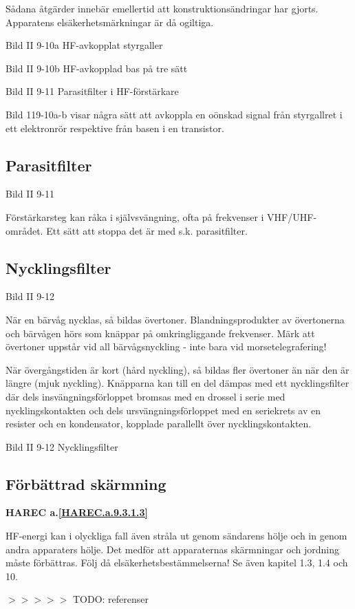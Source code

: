 Sådana åtgärder innebär emellertid att konstruktionsändringar har
gjorts. Apparatens elsäkerhetsmärkningar är då ogiltiga.

Bild II 9-10a HF-avkopplat styrgaller

Bild II 9-10b HF-avkopplad bas på tre sätt

Bild II 9-11 Parasitfilter i HF-förstärkare

Bild 119-10a-b visar några sätt att avkoppla en oönskad signal från
styrgallret i ett elektronrör respektive från basen i en transistor.

\subsection{Parasitfilter}

Bild II 9-11

Förstärkarsteg kan råka i självsvängning, ofta på frekvenser i
VHF/UHF-området. Ett sätt att stoppa det är med s.k. parasitfilter.

\subsection{Nycklingsfilter}

Bild II 9-12

När en bärvåg nycklas, så bildas övertoner.  Blandningsprodukter av
övertonerna och bärvågen hörs som knäppar på omkringliggande
frekvenser. Märk att övertoner uppstår vid all bärvågsnyckling - inte
bara vid morsetelegrafering!

När övergångstiden är kort (hård nyckling), så bildas fler övertoner
än när den är längre (mjuk nyckling). Knäpparna kan till en del dämpas
med ett nycklingsfilter där dels insvängningsförloppet bromsas med en
drossel i serie med nycklingskontakten och dels ursvängningsförloppet
med en seriekrets av en resister och en kondensator, kopplade
parallellt över nycklingskontakten.

Bild II 9-12 Nycklingsfilter

\subsection{Förbättrad skärmning}
\textbf{
HAREC a.\ref{HAREC.a.9.3.1.3}\label{myHAREC.a.9.3.1.3}
}

HF-energi kan i olyckliga fall även stråla ut genom sändarens hölje
och in genom andra apparaters hölje. Det medför att apparaternas
skärmningar och jordning måste förbättras. Följ då
elsäkerhetsbestämmelserna!  Se även kapitel 1.3, 1.4 och 10.

$>>>>>$ TODO: referenser
